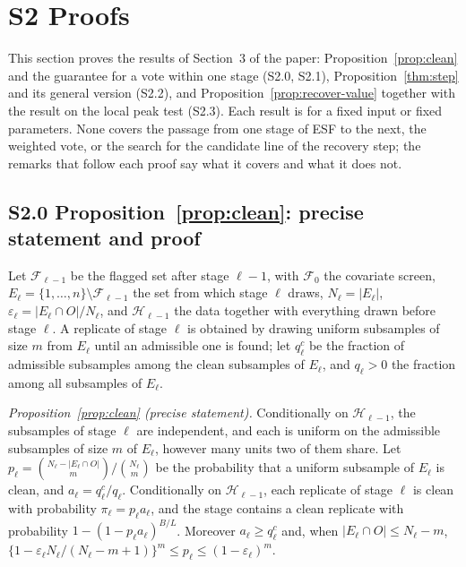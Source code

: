 \section*{S2 Proofs}
\label{supp:proofs}

This section proves the results of Section~3 of the paper: Proposition~\ref{prop:clean} and the guarantee for a vote within one stage (S2.0, S2.1), Proposition~\ref{thm:step} and its general version (S2.2), and Proposition~\ref{prop:recover-value} together with the result on the local peak test (S2.3). Each result is for a fixed input or fixed parameters. None covers the passage from one stage of ESF to the next, the weighted vote, or the search for the candidate line of the recovery step; the remarks that follow each proof say what it covers and what it does not.

\subsection*{S2.0 Proposition~\ref{prop:clean}: precise statement and proof}

Let $\mathcal F_{\ell-1}$ be the flagged set after stage $\ell-1$, with $\mathcal F_0$ the
covariate screen, $E_\ell=\{1,\dots,n\}\setminus\mathcal F_{\ell-1}$ the set from which stage
$\ell$ draws, $N_\ell=|E_\ell|$, $\varepsilon_\ell=|E_\ell\cap O|/N_\ell$, and $\mathcal H_{\ell-1}$ the data
together with everything drawn before stage $\ell$. A replicate of stage $\ell$ is obtained
by drawing uniform subsamples of size $m$ from $E_\ell$ until an admissible one is found; let
$q^{c}_\ell$ be the fraction of admissible subsamples among the clean subsamples of $E_\ell$,
and $q_\ell>0$ the fraction among all subsamples of $E_\ell$.

\emph{Proposition~\ref{prop:clean} (precise statement).}
Conditionally on $\mathcal H_{\ell-1}$, the subsamples of stage $\ell$ are independent, and each
is uniform on the admissible subsamples of size $m$ of $E_\ell$, however many units two of them
share. Let $p_\ell=\binom{N_\ell-|E_\ell\cap O|}{m}\big/\binom{N_\ell}{m}$ be the probability that a
uniform subsample of $E_\ell$ is clean, and $a_\ell=q^{c}_\ell/q_\ell$. Conditionally on
$\mathcal H_{\ell-1}$, each replicate of stage $\ell$ is clean with probability
$\pi_\ell=p_\ell a_\ell$, and the stage contains a clean replicate with probability
$1-(1-p_\ell a_\ell)^{B/L}$. Moreover $a_\ell\ge q^{c}_\ell$ and, when
$|E_\ell\cap O|\le N_\ell-m$,
$\{1-\varepsilon_\ell N_\ell/(N_\ell-m+1)\}^{m}\le p_\ell\le(1-\varepsilon_\ell)^{m}$.

